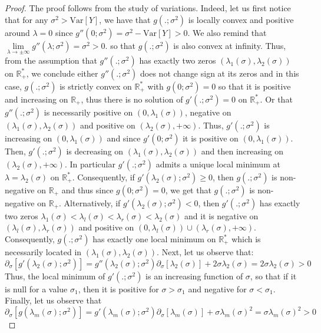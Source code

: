 \documentclass[a4paper, 10pt]{article}
\newcommand{\beq}{\begin{equation}}
\newcommand{\eeq}{\end{equation}}
\theoremstyle{definition}
\begin{document}
\begin{proof}The proof follows from the study of variations. Indeed, let us first notice that for any $\sigma^2>\text{Var}[Y]$, we have that $g(.;\sigma^2)$ is locally convex and positive around $\lambda=0$ since $g''(0;\sigma^2)=\sigma^2-\text{Var}[Y]>0$. We also remind that $\underset{\lambda\to \pm \infty}{\lim} g''(\lambda;\sigma^2)=\sigma^2>0$. so that $g(.;\sigma^2)$ is also convex at infinity. Thus, from the assumption that $g''(.;\sigma^2)$ has exactly two zeros $(\lambda_1(\sigma),\lambda_2(\sigma))$ on $\mathbb{R}_+^*$, we conclude either $g''(.;\sigma^2)$ does not change sign at its zeros and in this case, $g(.;\sigma^2)$ is strictly convex on $\mathbb{R}_+^*$ with $g(0;\sigma^2)=0$ so that it is positive and increasing on $\mathbb{R}_+$, thus there is no solution of $g'(.;\sigma^2)=0$ on $\mathbb{R}_+^*$. Or that $g''(.;\sigma^2)$ is necessarily positive on $(0,\lambda_1(\sigma))$, negative on $(\lambda_1(\sigma),\lambda_2(\sigma))$ and positive on $(\lambda_2(\sigma),+\infty)$. Thus, $g'(.;\sigma^2)$ is increasing on $(0,\lambda_1(\sigma))$ and since $g'(0;\sigma^2)$ it is positive on $(0,\lambda_1(\sigma))$. Then, $g'(.;\sigma^2)$ is decreasing on $(\lambda_1(\sigma),\lambda_2(\sigma))$ and then increasing on $(\lambda_2(\sigma),+\infty)$. In particular $g'(.;\sigma^2)$ admits a unique local minimum at $\lambda=\lambda_2(\sigma)$ on $\mathbb{R}_+^*$. Consequently, if $g'(\lambda_2(\sigma);\sigma^2)\geq 0$, then $g(.;\sigma^2)$ is non-negative on $\mathbb{R}_+$ and thus since $g(0;\sigma^2)=0$, we get that $g(.;\sigma^2)$ is non-negative on $\mathbb{R}_+$. Alternatively, if $g'(\lambda_2(\sigma);\sigma^2)<0$, then $g'(.;\sigma^2)$ has exactly two zeros $\lambda_1(\sigma)<\lambda_l(\sigma)<\lambda_r(\sigma)<\lambda_2(\sigma)$ and it is negative on $(\lambda_l(\sigma),\lambda_r(\sigma))$ and positive on $(0,\lambda_l(\sigma))\cup(\lambda_r(\sigma),+\infty)$. Consequently, $g(.;\sigma^2)$ has exactly one local minimum on $\mathbb{R}_+^*$ which is necessarily located in  $(\lambda_1(\sigma),\lambda_2(\sigma))$.
Next, let us observe that:
\beq \partial_\sigma[g'(\lambda_2(\sigma);\sigma^2)]=g''(\lambda_2(\sigma);\sigma^2) \partial_\sigma[\lambda_2(\sigma)]+ 2\sigma\lambda_2(\sigma)=2\sigma\lambda_2(\sigma)>0\eeq
Thus, the local minimum of $g'(.;\sigma^2)$ is an increasing function of $\sigma$, so that if it is null for a value $\sigma_1$, then it is positive for $\sigma>\sigma_1$ and negative for $\sigma<\sigma_1$.
Finally, let us observe that
\beq  \partial_\sigma[g(\lambda_m(\sigma);\sigma^2)]=g'(\lambda_m(\sigma);\sigma^2) \partial_\sigma[\lambda_m(\sigma)]+ \sigma\lambda_m(\sigma)^2=\sigma\lambda_m(\sigma)^2>0\eeq

\end{proof}
\end{document}
